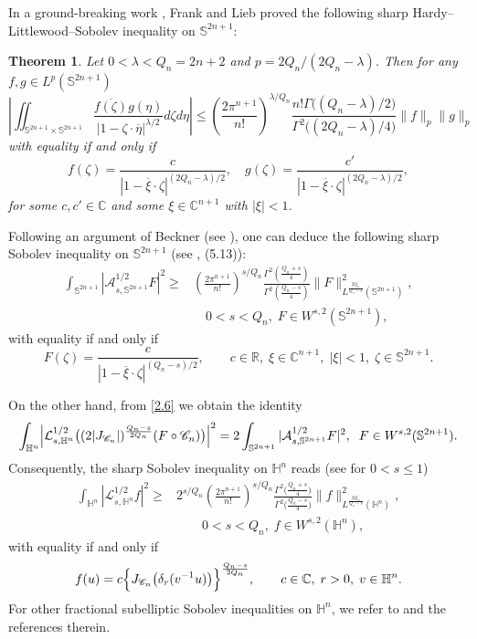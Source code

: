 \documentclass[12pt,reqno]{amsart}%
\newtheorem{theorem}{Theorem}[section]
\theoremstyle{plain}
\numberwithin{equation}{section}
\begin{document}
In a ground-breaking work \cite{fl2}, Frank and Lieb proved the following sharp Hardy--Littlewood--Sobolev inequality on \(\mathbb{S}^{2n+1}\):
\begin{theorem}\cite{fl2} \label{HLS2}
Let $0 < \lambda < Q_n = 2n + 2$ and $p= 2Q_n/(2Q_n - \lambda)$. Then for any $f,g \in L^p(\mathbb{S}^{2n+1})$
\[
\left| \iint_{\mathbb{S}^{2n+1} \times \mathbb{S}^{2n+1}} \frac{\overline{f(\zeta)} g(\eta)}{|1 - \zeta \cdot \overline{\eta}|^{\lambda/2}} d\zeta d\eta \right|
\leq \left( \frac{2\pi^{n+1}}{n!} \right)^{\lambda/Q_n} \frac{n! \Gamma\bigl((Q_n - \lambda)/2\bigr)}{\Gamma^2\bigl((2Q_n - \lambda)/4\bigr)} \|f\|_p \|g\|_p
\]
with equality if and only if
\[
f(\zeta) = \frac{c}{|1 - \overline{\xi} \cdot \zeta|^{(2Q_n-\lambda)/2}}, \quad g(\zeta) = \frac{c'}{|1 - \overline{\xi} \cdot \zeta|^{(2Q_n-\lambda)/2}},
\]
for some $c, c' \in \mathbb{C}$ and some $\xi \in \mathbb{C}^{n+1}$ with $|\xi| < 1$.
\end{theorem}
Following an argument of Beckner (see \cite[Theorem 6]{be1}), one can  deduce the  following sharp Sobolev inequality on \(\mathbb{S}^{2n+1}\) (see \cite{fl2}, (5.13)):
\begin{align}\label{Sobolev inequalities1}
\int_{\mathbb{S}^{2n+1}} |\mathcal{A}_{s,\mathbb{S}^{2n+1}}^{1/2}F|^{2} \geq& \left( \frac{2\pi^{n+1}}{n!} \right)^{s/Q_n} \frac{\Gamma^{2}(\frac{Q_n +s}{4})}{\Gamma^2(\frac{Q_n-s}{4})} \|F\|_{L^{\frac{2Q_n}{Q_n-s}}(\mathbb{S}^{2n+1})}^{2},\\
\nonumber
&\quad  0<s<Q_n,\; F\in W^{s,2}(\mathbb{S}^{2n+1}),
\end{align}
with equality if and only if
\[
F(\zeta) = \frac{c}{|1 - \overline{\xi} \cdot \zeta|^{(Q_n - s)/2}}, \qquad
c \in \mathbb{R},\; \xi \in \mathbb{C}^{n+1},\; |\xi| < 1,\; \zeta \in \mathbb{S}^{2n+1}.
\]

On the other hand, from \eqref{2.6} we obtain the identity
\begin{align}\label{a2.6}
\int_{\mathbb{H}^{n}}\Bigl|\mathcal{L}_{s,\mathbb{H}^{n}}^{1/2}
\bigl( (2|J_{\mathscr{C}_{n}}|)^{\frac{Q_n-s}{2Q_n}} (F \circ \mathscr{C}_{n}) \bigr)\Bigr|^{2}
= 2\int_{\mathbb{S}^{2n+1}} |\mathcal{A}_{s,\mathbb{S}^{2n+1}}^{1/2} F|^{2},
\;\; F \in W^{s,2}(\mathbb{S}^{2n+1}).
\end{align}
Consequently, the sharp Sobolev inequality on \(\mathbb{H}^{n}\) reads (see \cite{Cha} for $0<s\leq 1$)
\begin{align}\label{Sobolev inequalities2}
\int_{\mathbb{H}^{n}}|\mathcal{L}_{s,\mathbb{H}^{n}}^{1/2}f|^{2}
\geq& 2^{s/Q_n} \left( \frac{2\pi^{n+1}}{n!} \right)^{s/Q_n}
\frac{\Gamma^{2}\bigl(\frac{Q_n + s}{4}\bigr)}{\Gamma^{2}\bigl(\frac{Q_n - s}{4}\bigr)}
\|f\|_{L^{\frac{2Q_n}{Q_n - s}}(\mathbb{H}^{n})}^{2},\\
\nonumber
&\qquad 0 < s < Q_n,\; f \in W^{s,2}(\mathbb{H}^{n}),
\end{align}
with equality if and only if
\[
f(u) = c \Bigl\{ J_{\mathscr{C}_{n}}\bigl(\delta_{r}(v^{-1}u)\bigr) \Bigr\}^{\frac{Q_n - s}{2Q_n}}, \qquad
c \in \mathbb{C},\; r > 0,\; v \in \mathbb{H}^n.
\]
For other fractional subelliptic Sobolev inequalities on $\mathbb{H}^{n}$, we refer to \cite{Gho} and the references therein.
\end{document}
